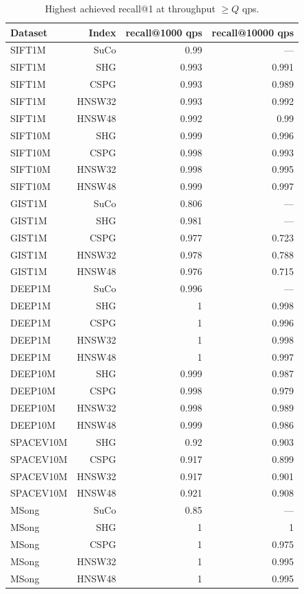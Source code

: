 \begin{table}[t]
\centering
\small
\caption{Highest achieved recall@1 at throughput \(\geq Q\) qps.}
\label{tab:recall-at-qps-k1}
\begin{tabular}{lrrr}
\toprule
Dataset & Index & recall@1000 qps & recall@10000 qps \\
\midrule
SIFT1M & SuCo & 0.99 & — \\
SIFT1M & SHG & 0.993 & 0.991 \\
SIFT1M & CSPG & 0.993 & 0.989 \\
SIFT1M & HNSW32 & 0.993 & 0.992 \\
SIFT1M & HNSW48 & 0.992 & 0.99 \\
SIFT10M & SHG & 0.999 & 0.996 \\
SIFT10M & CSPG & 0.998 & 0.993 \\
SIFT10M & HNSW32 & 0.998 & 0.995 \\
SIFT10M & HNSW48 & 0.999 & 0.997 \\
GIST1M & SuCo & 0.806 & — \\
GIST1M & SHG & 0.981 & — \\
GIST1M & CSPG & 0.977 & 0.723 \\
GIST1M & HNSW32 & 0.978 & 0.788 \\
GIST1M & HNSW48 & 0.976 & 0.715 \\
DEEP1M & SuCo & 0.996 & — \\
DEEP1M & SHG & 1 & 0.998 \\
DEEP1M & CSPG & 1 & 0.996 \\
DEEP1M & HNSW32 & 1 & 0.998 \\
DEEP1M & HNSW48 & 1 & 0.997 \\
DEEP10M & SHG & 0.999 & 0.987 \\
DEEP10M & CSPG & 0.998 & 0.979 \\
DEEP10M & HNSW32 & 0.998 & 0.989 \\
DEEP10M & HNSW48 & 0.999 & 0.986 \\
SPACEV10M & SHG & 0.92 & 0.903 \\
SPACEV10M & CSPG & 0.917 & 0.899 \\
SPACEV10M & HNSW32 & 0.917 & 0.901 \\
SPACEV10M & HNSW48 & 0.921 & 0.908 \\
MSong & SuCo & 0.85 & — \\
MSong & SHG & 1 & 1 \\
MSong & CSPG & 1 & 0.975 \\
MSong & HNSW32 & 1 & 0.995 \\
MSong & HNSW48 & 1 & 0.995 \\

\end{tabular}
\end{table}
